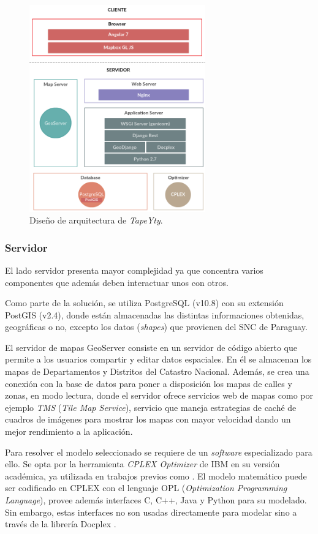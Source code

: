 \documentclass[conference]{IEEEtran}
\begin{document}
\begin{figure}[tbp]
\centerline{\includegraphics[width=7.6cm]{imagenes/20190424_WebAppArchitectureDesign.png}}
\caption{Diseño de arquitectura de \textit{TapeYty}.}
\label{fig:disenhoArquitectura}
\end{figure}

\subsubsection{Servidor}

El lado servidor presenta mayor complejidad ya que concentra varios componentes que además deben interactuar unos con otros.

Como parte de la solución, se utiliza PostgreSQL (v10.8) con su extensión PostGIS (v2.4), donde están almacenadas las distintas informaciones obtenidas, geográficas o no, excepto los datos (\textit{shapes}) que provienen del SNC de Paraguay.

El servidor de mapas GeoServer \cite{GeoServer} consiste en un servidor de código abierto que permite a los usuarios compartir y editar datos espaciales. En él se almacenan los mapas de Departamentos y Distritos del Catastro Nacional. Además, se crea una conexión con la base de datos para poner a disposición los mapas de calles y zonas, en modo lectura, donde el servidor ofrece servicios web de mapas como por ejemplo \textit{TMS} (\textit{Tile Map Service}), servicio que maneja estrategias de caché de cuadros de imágenes para mostrar los mapas con mayor velocidad dando un mejor rendimiento a la aplicación.

Para resolver el modelo seleccionado se requiere de un \textit{software} especializado para ello. Se opta por la herramienta \textit{CPLEX Optimizer} de IBM \cite{CPLEXOptimizer} en su versión académica, ya utilizada en trabajos previos como \cite{Vecchi2016ACollection,Ramos2018TheApproaches,BabaeeTirkolaee2019DevelopingStudy}. El modelo matemático puede ser codificado en CPLEX con el lenguaje OPL ({\textit{Optimization Programming Language}}), provee además interfaces C, C++, Java y Python para su modelado. Sin embargo, estas interfaces no son usadas directamente para modelar sino a través de la librería Docplex \cite{Docplex}.
\end{document}
